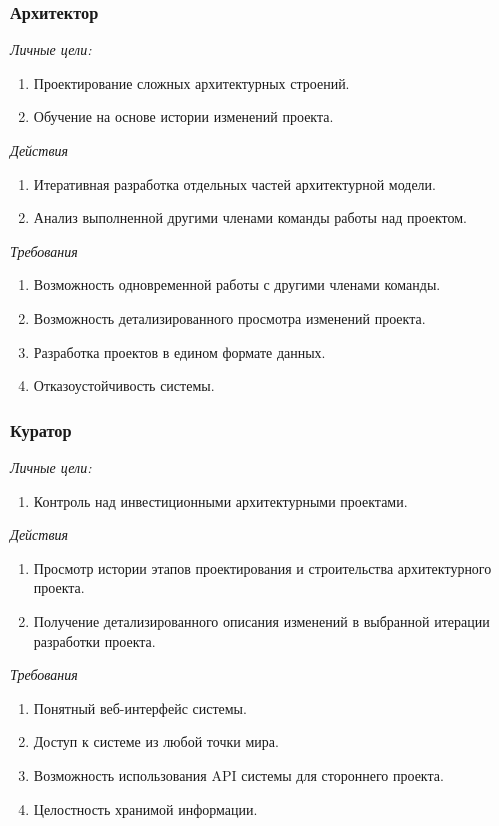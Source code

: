 \documentclass[a4paper,14pt]{extreport} %
\begin{document}
\subsubsection{Архитектор}

\textit{Личные цели:}
\begin{enumerate}
\item Проектирование сложных архитектурных строений.
\item Обучение на основе истории изменений проекта.
\end{enumerate}
\textit{Действия}
\begin{enumerate}
\item Итеративная разработка отдельных частей архитектурной модели.
\item Анализ выполненной другими членами команды работы над проектом.
\end{enumerate}
\textit{Требования}
\begin{enumerate}
\item Возможность одновременной работы с другими членами команды.
\item Возможность детализированного просмотра изменений проекта.
\item Разработка проектов в едином формате данных.
\item Отказоустойчивость системы.
\end{enumerate}

\subsubsection{Куратор}

\textit{Личные цели:}
\begin{enumerate}
\item Контроль над инвестиционными архитектурными проектами.
\end{enumerate}
\textit{Действия}
\begin{enumerate}
\item Просмотр истории этапов проектирования и строительства архитектурного проекта.
\item Получение детализированного описания изменений в выбранной итерации разработки проекта.
\end{enumerate}
\textit{Требования}
\begin{enumerate}
\item Понятный веб-интерфейс системы.
\item Доступ к системе из любой точки мира.
\item Возможность использования API системы для стороннего проекта.
\item Целостность хранимой информации.
\end{enumerate}
\end{document}
